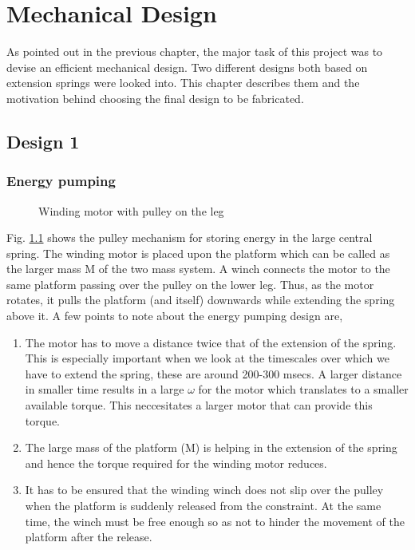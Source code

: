 \chapter{Mechanical Design}
\label{chap:mech_design}
As pointed out in the previous chapter, the major task of this project was to devise an efficient mechanical
design. Two different designs both based on extension springs were looked into. 
This chapter describes them and the motivation behind choosing the final design to be fabricated.

\section{Design 1}
\subsection{Energy pumping}
\begin{figure}[!h]
\centering
\caption{Winding motor with pulley on the leg}
\label{fig:3_pratik_design}
\end{figure}
Fig. \ref{fig:3_pratik_design} shows the pulley mechanism for storing energy in the large central spring.
The winding motor is placed upon the platform which can be called as the larger mass M of the two mass
system. A winch connects the motor to the same platform passing over the pulley on the lower leg. Thus, as
the motor rotates, it pulls the platform (and itself) downwards while extending the spring above it. 
A few points to note about the energy pumping design are,
\begin{enumerate}
\item
The motor has to move a distance twice that of the extension of the spring. This is
especially important when we look at the timescales over which we have to extend the spring, these are around
200-300 msecs. A larger distance in smaller time results in a large $\omega$ for the motor which translates
to a smaller available torque. This neccesitates a larger motor that can provide this torque. 
\item
The large mass of the platform (M) is helping in the extension of the spring and hence the torque required
for the winding motor reduces.
\item
It has to be ensured that the winding winch does not slip over the pulley when the platform is suddenly released from
the constraint. At the same time, the winch must be free enough so as not to hinder the movement of the platform after
the release.
\end{enumerate}

